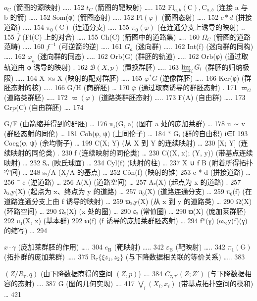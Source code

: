  \(o_{C}\) (箭图的源映射) \ldots.. 152 \(t_{C}\) (箭图的靶映射) \ldots.. 152 \(\mathrm{Fl}_{a,b}(\mathrm{C}), \mathrm{C}_{a,b}\) (连接 a 与 b 的箭) \ldots.. 152 Som(φ) (箭图态射) \ldots.. 152 \(\mathrm{Fl}(\varphi)\) (箭图态射) \ldots.. 152 \(c*d\) (拼接道路) \ldots.. 154 \(\pi_{0}(\mathrm{C})\) (连通分支) \ldots.. 155 \(\pi_{0}(\varphi)\) (在连通分支上诱导的映射) .. 155 \(\overline{f}\) (Fl(C) 上的对合) \ldots.. 155 Ch(C) (箭图中的道路集) \ldots.. 160 \(\Omega_{C}\) (箭图的道路范畴) \ldots.. 160 \(f^{-1}\) (可逆箭的逆) \ldots.. 161 \(G_{a}\) (迷向群) \ldots.. 162 Int(f) (迷向群的同构) \ldots.. 162 \(\varphi_{a}\) (迷向群的同态) \ldots.. 162 Orb(G) (群胚的轨道) \ldots.. 162 Orb(φ) (通过取轨道由 φ 诱导的映射) . 162 \(\mathcal{B}(X,p)\) (置换群胚) \ldots.. 163 \(\varinjlim_{i}G_{i}\) (群胚的归纳极限) \ldots.. 164 X ×s X (映射的配对群胚) \ldots.. 165 \(\varphi^{*}G\) (逆像群胚) \ldots.. 166 Ker(φ) (群胚态射的核) \ldots.. 166 G/H (商群胚) \ldots{} 170 \(\overline{\varphi}\) (通过取商诱导的群胚态射) . 171 \(\varpi_{G}\) (道路类群胚) \ldots.. 172 \(\varpi(\varphi)\) (道路类群胚态射) \ldots.. 173 F(A) (自由群) \ldots.. 173 Grp(C) (自由群胚) \ldots. 174

G/F (由箭缩并得到的群胚) \ldots{} 176 π₁(G, a) (图在 a 处的庞加莱群) \ldots{} 178 u ∼ v (群胚态射的同伦) \ldots{} 181 Coh(φ, ψ) (上同伦子) \ldots{} 184 * Gᵢ (群的自由积) i∈I 193 Coeg(φ, ψ) (余均衡子) \ldots{} 199 C(X; Y) (从 X 到 Y 的连续映射) \ldots{} 230 {[}X; Y{]} (连续映射的同伦类) . 230 f (连续映射的同伦类) \ldots{} 230 C((X, x); (Y, y)) (带基点连续映射) \ldots{} 232 Sₙ (欧氏球面) \ldots{} 234 Cyl(f) (映射的柱) \ldots{} 237 X ∪ f B (附着所得拓扑空间) \ldots{} 248 sₓ/A (X/A 的基点) \ldots{} 252 Côn(f) (映射的锥) 253 c * d (拼接道路) \ldots{} 256 ¯ c (逆道路) \ldots{} 256 Λ(X) (道路空间) \ldots{} 257 Λₓ(X) (起点为 x 的道路) . 257 λₓ,y(X) (起点为 x、终点为 y 的道路) \ldots{} 257 π₀(X) (道路连通分支) \ldots{} 259 π₀(f) (在道路连通分支上由 f 诱导的映射) \ldots{} 259 ϖₓ,y(X) (从 x 到 y 的道路类) \ldots{} 290 Ω(X) (环路空间) \ldots{} 290 Ωₓ(X) (x 处的圈) \ldots{} 290 εₓ (常值圈) \ldots{} 290 ϖ(X) (庞加莱群胚) 292 π₁(X, x) (基本群) 292 ϖ(f) (f 诱导的庞加莱群胚态射) \ldots{} 294 f*(γ) (ϖₓ,y(f)(γ) 的缩写) \ldots{} 294

 \(x \cdot \gamma\) (庞加莱群胚的作用) \ldots.. 304 \(e_{\mathrm{B}}\) (靶映射) \ldots.. 342 \(\varepsilon_{\mathrm{B}}\) (靶映射) \ldots.. 342 \(\pi_{1}(\mathrm{G})\) (拓扑群的庞加莱群) \ldots.. 375 \(\mathrm{R}_{\tau} \{\xi z_{1}, z_{2}\}\) (与下降数据相关联的等价关系) \ldots.. 383

\((Z/R_{\tau},q)\) (由下降数据商得的空间 \((Z,p)\)) \ldots. 384 \(C_{\tau,\tau'}(Z;Z')\) (与下降数据相容的态射) \ldots. 387 \textbar G\textbar{} (图的几何实现) \ldots. 417 \(\bigvee_{i}(X_{i},x_{i})\) (带基点拓扑空间的楔和) \ldots{} 421

